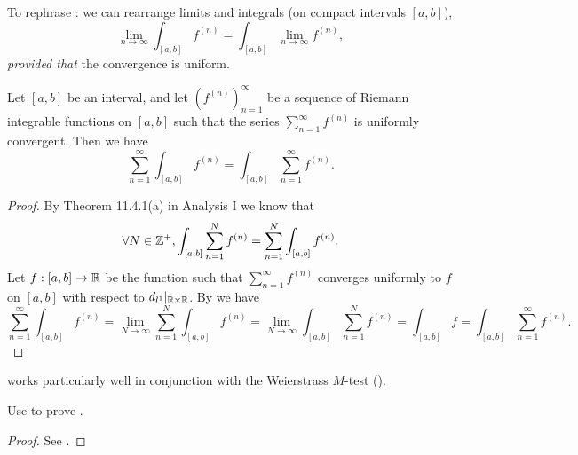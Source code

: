 \begin{note}
  To rephrase :
  we can rearrange limits and integrals (on compact intervals \([a, b]\)),
  \[
    \lim_{n \to \infty} \int_{[a, b]} f^{(n)} = \int_{[a, b]} \lim_{n \to \infty} f^{(n)},
  \]
  \emph{provided that} the convergence is uniform.
\end{note}

\begin{cor}\label{ii:3.6.2}
  Let \([a, b]\) be an interval, and let \((f^{(n)})_{n = 1}^\infty\) be a sequence of Riemann integrable functions on \([a, b]\) such that the series \(\sum_{n = 1}^\infty f^{(n)}\) is uniformly convergent.
  Then we have
  \[
    \sum_{n = 1}^\infty \int_{[a, b]} f^{(n)} = \int_{[a, b]} \sum_{n = 1}^\infty f^{(n)}.
  \]
\end{cor}

\begin{proof}
  By Theorem 11.4.1(a) in Analysis I we know that
  \[
    \forall N \in \mathbb{Z}^+, \int_{[a, b]} \sum_{n = 1}^N f^{(n)} = \sum_{n = 1}^N \int_{[a, b]} f^{(n)}.
  \]
  Let \(f : [a, b] \to \mathbb{R}\) be the function such that \(\sum_{n = 1}^\infty f^{(n)}\) converges uniformly to \(f\) on \([a, b]\) with respect to \(d_{l^1}|_{\mathbb{R} \times \mathbb{R}}\).
  By  we have
  \[
    \sum_{n = 1}^\infty \int_{[a, b]} f^{(n)} = \lim_{N \to \infty} \sum_{n = 1}^N \int_{[a, b]} f^{(n)} = \lim_{N \to \infty} \int_{[a, b]} \sum_{n = 1}^N f^{(n)} = \int_{[a, b]} f = \int_{[a, b]} \sum_{n = 1}^\infty f^{(n)}.
  \]
\end{proof}

\begin{note}
   works particularly well in conjunction with the Weierstrass \(M\)-test
  ().
\end{note}

\exercisesection

\begin{ex}\label{ii:ex:3.6.1}
  Use  to prove .
\end{ex}

\begin{proof}
  See .
\end{proof}
